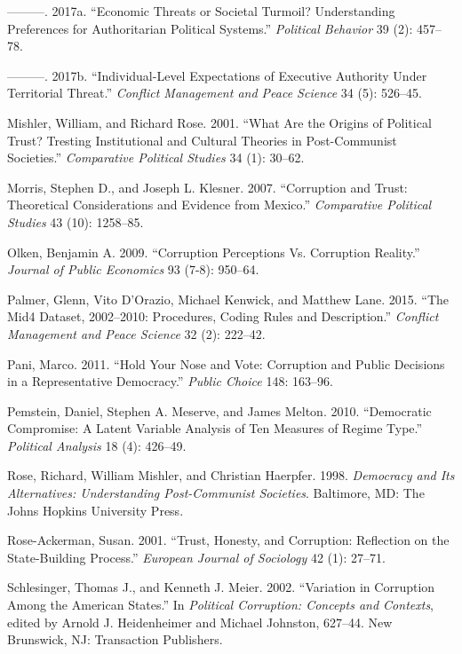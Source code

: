 \documentclass[11pt,]{article}
\begin{document}
\hypertarget{ref-miller2017etst}{}
---------. 2017a. ``Economic Threats or Societal Turmoil? Understanding
Preferences for Authoritarian Political Systems.'' \emph{Political
Behavior} 39 (2): 457--78.

\hypertarget{ref-miller2017ieea}{}
---------. 2017b. ``Individual-Level Expectations of Executive Authority
Under Territorial Threat.'' \emph{Conflict Management and Peace Science}
34 (5): 526--45.

\hypertarget{ref-mishlerrose2001wopt}{}
Mishler, William, and Richard Rose. 2001. ``What Are the Origins of
Political Trust? Tresting Institutional and Cultural Theories in
Post-Communist Societies.'' \emph{Comparative Political Studies} 34 (1):
30--62.

\hypertarget{ref-morrisklesner2007ct}{}
Morris, Stephen D., and Joseph L. Klesner. 2007. ``Corruption and Trust:
Theoretical Considerations and Evidence from Mexico.'' \emph{Comparative
Political Studies} 43 (10): 1258--85.

\hypertarget{ref-olken2009cpcr}{}
Olken, Benjamin A. 2009. ``Corruption Perceptions Vs. Corruption
Reality.'' \emph{Journal of Public Economics} 93 (7-8): 950--64.

\hypertarget{ref-palmeretal2015mid4}{}
Palmer, Glenn, Vito D'Orazio, Michael Kenwick, and Matthew Lane. 2015.
``The Mid4 Dataset, 2002--2010: Procedures, Coding Rules and
Description.'' \emph{Conflict Management and Peace Science} 32 (2):
222--42.

\hypertarget{ref-pani2011hnv}{}
Pani, Marco. 2011. ``Hold Your Nose and Vote: Corruption and Public
Decisions in a Representative Democracy.'' \emph{Public Choice} 148:
163--96.

\hypertarget{ref-pemsteinetal2010dc}{}
Pemstein, Daniel, Stephen A. Meserve, and James Melton. 2010.
``Democratic Compromise: A Latent Variable Analysis of Ten Measures of
Regime Type.'' \emph{Political Analysis} 18 (4): 426--49.

\hypertarget{ref-roseetal1998da}{}
Rose, Richard, William Mishler, and Christian Haerpfer. 1998.
\emph{Democracy and Its Alternatives: Understanding Post-Communist
Societies}. Baltimore, MD: The Johns Hopkins University Press.

\hypertarget{ref-roseackerman1999thc}{}
Rose-Ackerman, Susan. 2001. ``Trust, Honesty, and Corruption: Reflection
on the State-Building Process.'' \emph{European Journal of Sociology} 42
(1): 27--71.

\hypertarget{ref-schlesingermeier2002vcas}{}
Schlesinger, Thomas J., and Kenneth J. Meier. 2002. ``Variation in
Corruption Among the American States.'' In \emph{Political Corruption:
Concepts and Contexts}, edited by Arnold J. Heidenheimer and Michael
Johnston, 627--44. New Brunswick, NJ: Transaction Publishers.
\end{document}
